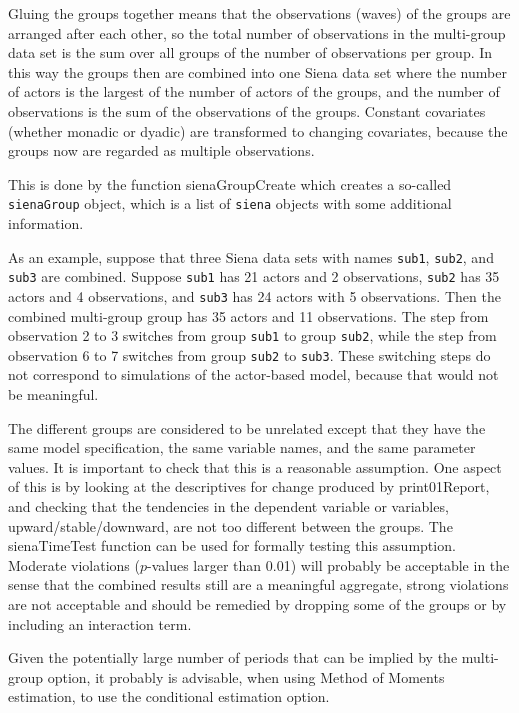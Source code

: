 \documentclass[a4paper,fleqn,11pt]{article}
\newcommand{\+}{\, + \,}
\begin{document}
Gluing the groups together means that the observations (waves) of the groups
are arranged after each other, so the total number of observations
in the multi-group data set is the sum over all groups of the
number of observations per group. In this way
the groups then are combined into one Siena data set
where the number of actors is the largest of the number of
actors of the groups, and the number of observations
is the sum of the observations of the groups.
Constant covariates (whether monadic or dyadic) are transformed
to changing covariates, because the groups now are regarded
as multiple observations.

This is done by the function \textsf{sienaGroupCreate} which creates
a so-called \texttt{sienaGroup} object, which is a list of
\texttt{siena} objects with some additional information.

As an example, suppose that three Siena data sets with names {\tt sub1}, {\tt sub2},
and {\tt sub3} are combined. Suppose {\tt sub1} has 21 actors and
2 observations, {\tt sub2} has 35 actors and 4 observations,
and {\tt sub3} has 24 actors with 5 observations.
Then the combined multi-group group has 35 actors and 11 observations.
The step from observation 2 to 3 switches from group {\tt sub1}
to group {\tt sub2}, while
the step from observation 6 to 7 switches from group {\tt sub2}
to {\tt sub3}. These switching steps do not correspond to simulations
of the actor-based model, because that would not be meaningful.

The different groups are considered to be unrelated
except that they have the same model specification,
the same variable names, and the same parameter values.
It is important to check that this is a reasonable assumption.
One aspect of this is by looking at the descriptives for change
produced by \textsf{print01Report}, and checking that the
tendencies in the dependent variable or variables, upward/stable/downward,
are not too different between the groups.
The \textsf{sienaTimeTest} function can be used for
formally testing this assumption.
Moderate violations ($p$-values larger than 0.01) will probably
be acceptable in the sense that the combined results
still are a meaningful aggregate, strong violations are not acceptable
and should be remedied by dropping some of the groups or by
including an interaction term.

Given the potentially large number of periods that can be implied
by the multi-group option, it probably is advisable,
when using Method of Moments estimation, to use
the conditional estimation option.
\end{document}
